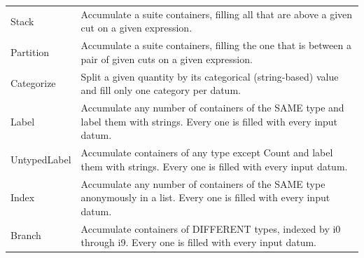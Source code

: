 \documentclass{beamer}
\begin{document}
\begin{frame}
\begin{minipage}{\linewidth}
\begin{tabular}{p{0.1\linewidth} p{0.9\linewidth}}
Stack           & Accumulate a suite containers, filling all that are above a given cut on a given expression. \\
Partition       & Accumulate a suite containers, filling the one that is between a pair of given cuts on a given expression. \\
Categorize      & Split a given quantity by its categorical (string-based) value and fill only one category per datum. \\
Label           & Accumulate any number of containers of the SAME type and label them with strings. Every one is filled with every input datum. \\
UntypedLabel    & Accumulate containers of any type except Count and label them with strings. Every one is filled with every input datum. \\
Index           & Accumulate any number of containers of the SAME type anonymously in a list. Every one is filled with every input datum. \\
Branch          & Accumulate containers of DIFFERENT types, indexed by i0 through i9. Every one is filled with every input datum. \\
\end{tabular}
\end{minipage}
\end{frame}
\end{document}
